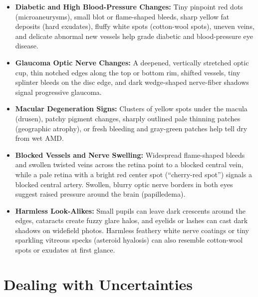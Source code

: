 \begin{itemize}
    \item \textbf{Diabetic and High Blood-Pressure Changes:} Tiny pinpoint red dots (microaneurysms), small blot or flame-shaped bleeds, sharp yellow fat deposits (hard exudates), fluffy white spots (cotton-wool spots), uneven veins, and delicate abnormal new vessels help grade diabetic and blood-pressure eye disease.
    \item \textbf{Glaucoma Optic Nerve Changes:} A deepened, vertically stretched optic cup, thin notched edges along the top or bottom rim, shifted vessels, tiny splinter bleeds on the disc edge, and dark wedge-shaped nerve-fiber shadows signal progressive glaucoma.
    \item \textbf{Macular Degeneration Signs:} Clusters of yellow spots under the macula (drusen), patchy pigment changes, sharply outlined pale thinning patches (geographic atrophy), or fresh bleeding and gray-green patches help tell dry from wet AMD.
    \item \textbf{Blocked Vessels and Nerve Swelling:} Widespread flame-shaped bleeds and swollen twisted veins across the retina point to a blocked central vein, while a pale retina with a bright red center spot (``cherry-red spot'') signals a blocked central artery. Swollen, blurry optic nerve borders in both eyes suggest raised pressure around the brain (papilledema).
    \item \textbf{Harmless Look-Alikes:} Small pupils can leave dark crescents around the edges, cataracts create fuzzy glare halos, and eyelids or lashes can cast dark shadows on widefield photos. Harmless feathery white nerve coatings or tiny sparkling vitreous specks (asteroid hyalosis) can also resemble cotton-wool spots or exudates at first glance.
\end{itemize}

\section{Dealing with Uncertainties}

